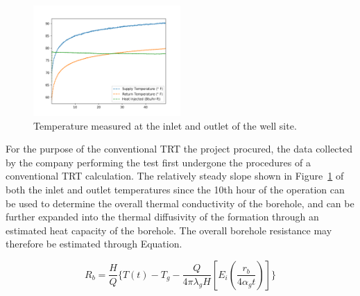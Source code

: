 	\begin{figure}
	\centering
	\includegraphics[width=0.5\textwidth]{data/TRTraw}	
	\caption{Temperature measured at the inlet and outlet of the well site.}\label{fg:raw}
	\end{figure}
	
	For the purpose of the conventional TRT the project procured, the data collected by the company performing the test first undergone the procedures of a conventional TRT calculation. The relatively steady slope shown in Figure~\ref{fg:raw} of both the inlet and outlet temperatures since the 10th hour of the operation can be used to determine the overall thermal conductivity of the borehole, and can be further expanded into the thermal diffusivity of the formation through an estimated heat capacity of the borehole. The overall borehole resistance may therefore be estimated through Equation. 
	
	\begin{equation}
		R_b = \frac{H}{Q}\{ T(t) - T_g -\frac{Q}{4\pi \lambda_g H} [E_i(\frac{r_b}{4 \alpha_g t})]   \}
	\end{equation}